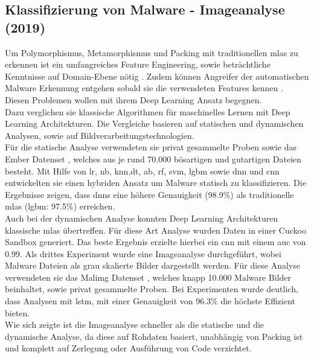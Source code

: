 \documentclass[
    12pt, %
    DIV10,
    ngerman, %
    a4paper, %
    oneside, %
    titlepage, %
    parskip=half, %
    headings=normal, %
    listof=totoc, %
    bibliography=totoc, %
    index=totoc, %
    captions=tableheading, %
    final %
]{scrreprt}
\begin{document}
\subsection{Klassifizierung von Malware - Imageanalyse (2019)}\label{ember}
Um Polymorphismus, Metamorphismus und Packing mit traditionellen \ac{mlas} zu erkennen ist ein umfangreiches Feature Engineering, sowie beträchtliche Kenntnisse auf Domain-Ebene nötig \parencite{rhode2018early}. Zudem können Angreifer der automatischen Malware Erkennung entgehen sobald sie die verwendeten Features kennen \parencite{anderson2017evading}. Diesen Problemen wollen \textcite{Vinayakumar2019} mit ihrem Deep Learning Ansatz begegnen.\\
Dazu verglichen sie klassische Algorithmen für maschinelles Lernen mit Deep Learning Architekturen. Die Vergleiche basieren auf statischen und dynamischen Analysen, sowie auf Bildverarbeitungstechnologien.\\
Für die statische Analyse verwendeten sie privat gesammelte Proben sowie das Ember Datenset \parencite{anderson2018ember}, welches aus je rund 70.000 bösartigen und gutartigen Dateien besteht. Mit Hilfe von \ac{lr}, \ac{nb}, \ac{knn},\ac{dt}, \ac{ab}, \ac{rf}, \ac{svm}, \ac{lgbm} sowie \ac{dnn} und \ac{cnn} entwickelten sie einen hybriden Ansatz um Malware statisch zu klassifizieren. Die Ergebnisse zeigen, dass \ac{dnns} eine höhere Genauigkeit (98.9\%) als traditionelle \ac{mlas} (\ac{lgbm}: 97.5\%) erreichen.\\
Auch bei der dynamischen Analyse  konnten Deep Learning Architekturen klassische \ac{mlas} übertreffen. Für diese Art Analyse wurden Daten in einer Cuckoo Sandbox generiert. Das beste Ergebnis erzielte hierbei ein \ac{cnn} mit einem \ac{auc} von 0.99.
Als drittes Experiment wurde eine Imageanalyse durchgeführt, wobei Malware Dateien als grau skalierte Bilder dargestellt werden. Für diese Analyse verwendeten sie das Malimg Datenset \parencite{nataraj2011malware}, welches knapp 10.000 Malware Bilder beinhaltet, sowie privat gesammelte Proben. Bei Experimenten wurde deutlich, dass Analysen mit \ac{lstm}, mit einer Genauigkeit von 96.3\% die höchste Effizient bieten.\\
Wie sich zeigte ist die Imageanalyse schneller als die statische und die dynamische Analyse, da diese auf Rohdaten basiert, unabhängig von Packing ist und komplett auf Zerlegung oder Ausführung von Code verzichtet. 
\end{document}
